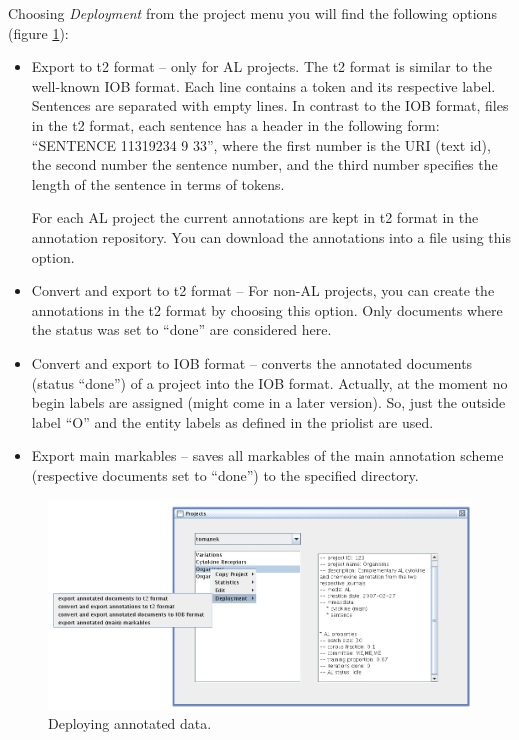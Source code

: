 \documentclass[DIV12,english,11pt,halfparskip]{scrartcl}
\begin{document}
Choosing \emph{Deployment} from the project menu you will find the
following options (figure \ref{fig:showprojects_deploy}):

\begin{itemize}
\item Export to t2 format -- only for AL projects. The t2 format is
  similar to the well-known IOB format. Each line contains a token and
  its respective label. Sentences are separated with empty lines. In
  contrast to the IOB format, files in the t2 format, each sentence
  has a header in the following form: ``SENTENCE 11319234 9 33'',
  where the first number is the URI (text id), the second number the
  sentence number, and the third number specifies the length of the
  sentence in terms of tokens.

  For each AL project the current annotations are kept in t2 format in
  the annotation repository. You can download the annotations into a
  file using this option.

\item Convert and export to t2 format -- For non-AL projects, you can
  create the annotations in the t2 format by choosing this option.
  Only documents where the status was set to ``done'' are considered
  here.

\item Convert and export to IOB format -- converts the annotated
  documents (status ``done'') of a project into the IOB format.
  Actually, at the moment no begin labels are assigned (might come in
  a later version). So, just the outside label ``O'' and the entity
  labels as defined in the priolist are used.

\item Export main markables -- saves all markables of the main
  annotation scheme (respective documents set to ``done'') to the
  specified directory.
\end{itemize}

\begin{figure}[h]
  \centering
  \includegraphics[scale=0.5]{figs/ShowProjects_Deploy.jpg}
  \caption{Deploying annotated data.}
  \label{fig:showprojects_deploy}
\end{figure}
\end{document}
